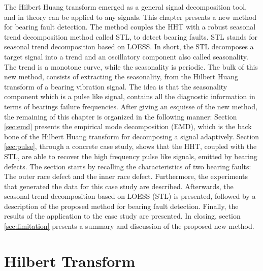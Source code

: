 \documentclass[../Main/thesis.tex]{subfiles}
\begin{document}
\justify
The Hilbert Huang transform emerged as a general signal decomposition tool, and in theory can be applied to any signals.
This chapter presents a new method for bearing fault detection. The method couples the HHT with a robust seasonal trend decomposition method called STL, to detect bearing faults. STL stands for seasonal trend decomposition based on LOESS. In short, the STL decomposes a target signal into a trend and an oscillatory component also called  seasonality. The trend is a monotone curve, while the seasonality is periodic.
The bulk of this new method, consists of extracting the seasonality, from the Hilbert Huang transform of a bearing vibration signal. The idea is that the seasonality component which is a pulse like signal, contains all the diagnostic information in terms of bearings failure frequencies.
\justify
After giving an esquisse of the new method, the remaining of this chapter is organized in the following manner:
 Section \ref{sec:emd} presents the empirical mode decomposition (EMD), which is the back bone of the Hilbert Huang transform for decomposing a signal adaptively.
 Section \ref{sec:pulse}, through a concrete case study, shows that the HHT, coupled with the STL, are able to recover the high frequency pulse like signals, emitted by bearing defects. The section starts by recalling the characteristics of two bearing faults: The outer race defect and the inner race defect. Furthermore, the experiments that generated the data for this case study are described. Afterwards, the seasonal trend decomposition based on LOESS (STL) is presented, followed by a description of the proposed method for bearing fault detection. Finally, the results of the application to the case study are presented. In closing, section \ref{sec:limitation} presents a summary and discussion of the proposed new method.
\justify
\section{Hilbert Transform}
\label{sec:ht}
\end{document}
